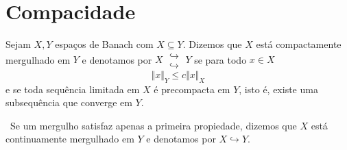 \documentclass[a4paper, 11pt]{book}
\theoremstyle{definition}
\newcommand{\obs}{\noindent{\textbf{\textcolor{black}{\sffamily Observação:}}}~}
\newcommand{\doublehookrightarrow}{\;\substack{\hookrightarrow \\ \hookrightarrow}\;}
\begin{document}
\section{Compacidade}

\begin{dbox}
    Sejam $X, Y$ espaços de Banach com $X \subseteq Y$. Dizemos que $X$ está compactamente mergulhado em $Y$ e denotamos por $X \doublehookrightarrow Y$
    se para todo $x \in X$
    \[
        \Vert x \Vert_{Y} \leqslant c \Vert x \Vert_X
    \]
    e se toda sequência limitada em $X$ é precompacta em $Y$, isto é, existe uma subsequência que converge em $Y$.
\end{dbox}

\obs Se um mergulho satisfaz apenas a primeira propiedade, dizemos que $X$ está continuamente mergulhado em $Y$ e denotamos por $X \hookrightarrow Y$.
\end{document}
